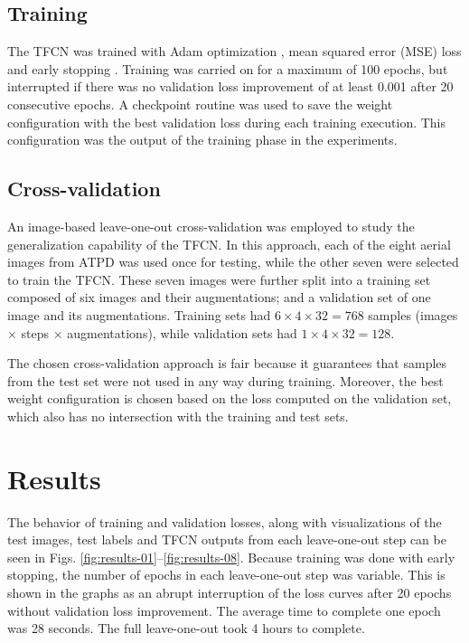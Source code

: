 \documentclass[conference]{IEEEtran}
\begin{document}
\subsection{Training}

The TFCN was trained with Adam optimization \cite{kingma:2015}, mean squared error (MSE) loss and early stopping \cite{prechelt:2012}.
Training was carried on for a maximum of 100 epochs, but interrupted if there was no validation loss improvement of at least 0.001 after 20 consecutive epochs.
A checkpoint routine was used to save the weight configuration with the best validation loss during each training execution.
This configuration was the output of the training phase in the experiments.

\subsection{Cross-validation}

An image-based leave-one-out cross-validation was employed to study the generalization capability of the TFCN.
In this approach, each of the eight aerial images from ATPD was used once for testing, while the other seven were selected to train the TFCN.
These seven images were further split into a training set composed of six images and their augmentations; and a validation set of one image and its augmentations.
Training sets had $6 \times 4 \times 32 = 768$ samples (images $\times$ steps $\times$ augmentations), while validation sets had $1 \times 4 \times 32 = 128$.

The chosen cross-validation approach is fair because it guarantees that samples from the test set were not used in any way during training.
Moreover, the best weight configuration is chosen based on the loss computed on the validation set, which also has no intersection with the training and test sets.

\section{Results}
\label{section:results}

The behavior of training and validation losses, along with visualizations of the test images, test labels and TFCN outputs from each leave-one-out step can be seen in Figs. \ref{fig:results-01}--\ref{fig:results-08}.
Because training was done with early stopping, the number of epochs in each leave-one-out step was variable.
This is shown in the graphs as an abrupt interruption of the loss curves after 20 epochs without validation loss improvement.
The average time to complete one epoch was 28 seconds.
The full leave-one-out took 4 hours to complete.
\end{document}

